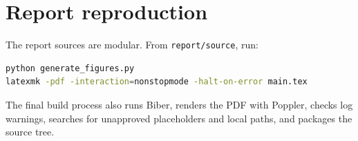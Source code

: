 \section{Report reproduction}

The report sources are modular. From \texttt{report/source}, run:
\begin{lstlisting}[language=bash]
python generate_figures.py
latexmk -pdf -interaction=nonstopmode -halt-on-error main.tex
\end{lstlisting}
The final build process also runs Biber, renders the PDF with Poppler, checks log warnings, searches for unapproved placeholders and local paths, and packages the source tree.
